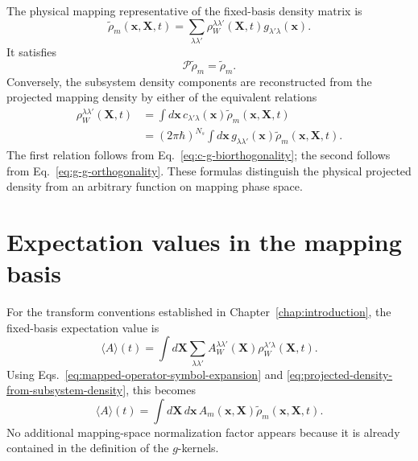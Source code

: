 \documentclass[
  11pt,
  letterpaper,
  onehalfspacing,
  normalmargins,
  equalmargins,
  oneside
]{ut-thesis}
\begin{document}
The physical mapping representative of the fixed-basis density matrix is
\begin{equation}
\tilde\rho_m(\mathbf x,\mathbf X,t)
=
\sum_{\lambda\lambda'}
\rho_W^{\lambda\lambda'}(\mathbf X,t)
 g_{\lambda'\lambda}(\mathbf x).
\label{eq:projected-density-from-subsystem-density}
\end{equation}
It satisfies
\begin{equation}
\mathcal P\tilde\rho_m=\tilde\rho_m.
\label{eq:projected-density-invariance}
\end{equation}
Conversely, the subsystem density components are reconstructed from the
projected mapping density by either of the equivalent relations
\begin{align}
\rho_W^{\lambda\lambda'}(\mathbf X,t)
&=
\int d\mathbf x\,
 c_{\lambda'\lambda}(\mathbf x)
 \tilde\rho_m(\mathbf x,\mathbf X,t)
\label{eq:subsystem-density-from-projected-density}
\\
&=
(2\pi\hbar)^{N_s}
\int d\mathbf x\,
 g_{\lambda\lambda'}(\mathbf x)
 \tilde\rho_m(\mathbf x,\mathbf X,t).
\label{eq:subsystem-density-from-projected-density-g}
\end{align}
The first relation follows from Eq.~\eqref{eq:c-g-biorthogonality}; the second
follows from Eq.~\eqref{eq:g-g-orthogonality}. These formulas distinguish the
physical projected density from an arbitrary function on mapping phase space.


\section{Expectation values in the mapping basis}
\label{sec:expectation-values-mapping-basis}

For the transform conventions established in Chapter~\ref{chap:introduction},
the fixed-basis expectation value is
\begin{equation}
\langle A\rangle(t)
=
\int d\mathbf X
\sum_{\lambda\lambda'}
A_W^{\lambda\lambda'}(\mathbf X)
\rho_W^{\lambda'\lambda}(\mathbf X,t).
\label{eq:subsystem-expectation-value-fixed-basis}
\end{equation}
Using Eqs.~\eqref{eq:mapped-operator-symbol-expansion} and
\eqref{eq:projected-density-from-subsystem-density}, this becomes
\begin{equation}
\langle A\rangle(t)
=
\int d\mathbf X\,d\mathbf x\,
A_m(\mathbf x,\mathbf X)
\tilde\rho_m(\mathbf x,\mathbf X,t).
\label{eq:mapping-expectation-value}
\end{equation}
No additional mapping-space normalization factor appears because it is already
contained in the definition of the \(g\)-kernels.
\end{document}
